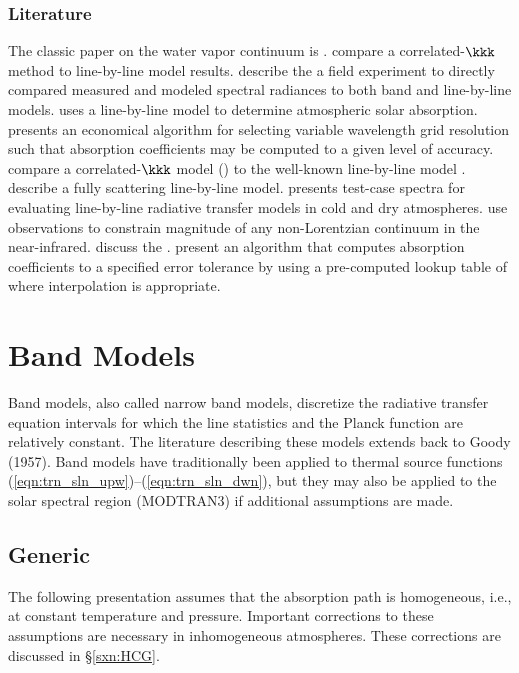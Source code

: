 \documentclass[12pt]{article}
\begin{document}
\subsubsection[Literature]{Literature}\label{sxn:lbl_ltr}
The classic paper on the water vapor continuum is \cite{CKD89}.
\cite{FuL92} compare a correlated-$\kkk$ method to line-by-line
model results.
\cite{ElW96} describe the a field experiment to directly compared
measured and modeled spectral radiances to both band and line-by-line
models. 
\cite{Cri972} uses a line-by-line model to determine atmospheric solar
absorption. 
\cite{Spa97} presents an economical algorithm for selecting variable
wavelength grid resolution such that absorption coefficients may be
computed to a given level of accuracy.
\cite{MTB97} compare a correlated-$\kkk$ model () to 
the well-known line-by-line model .
\cite{MoC97} describe a fully scattering line-by-line model.
\cite{WWM97} presents test-case spectra for evaluating line-by-line
radiative transfer models in cold and dry atmospheres.
\cite{VRC981} use observations to constrain magnitude of any
non-Lorentzian continuum in the near-infrared.
\cite{PHS00} discuss the .
\cite{QuD01} present an algorithm that computes absorption
coefficients to a specified error tolerance by using a pre-computed
lookup table of where interpolation is appropriate.

\section[Band Models]{Band Models}\label{sxn:nbm}

Band models, also called narrow band models, discretize the radiative
transfer equation  intervals for which the line statistics and the
Planck function are relatively constant. 
The literature describing these models extends back to Goody (1957).  
Band models have traditionally been applied to thermal source
functions (\ref{eqn:trn_sln_upw})--(\ref{eqn:trn_sln_dwn}), but they
may also be applied to the solar spectral region \cite[]{ZBP97}
(MODTRAN3) if additional assumptions are made. 

\subsection{Generic}\label{sxn:gnr}
The following presentation assumes that the absorption path is
homogeneous, i.e., at constant temperature and pressure. 
Important corrections to these assumptions are necessary in
inhomogeneous atmospheres.
These corrections are discussed in \S\ref{sxn:HCG}.
\end{document}
